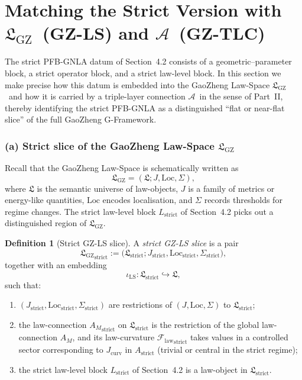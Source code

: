 \documentclass[11pt]{book}
\theoremstyle{plain}
\theoremstyle{definition}
\newtheorem{definition}[theorem]{Definition} \theoremstyle{remark}
\newcommand{\GZLStxt}{\textsf{GZ-LS}}   \newcommand{\GZLTtxt}{\textsf{GZ-LT}}   \newcommand{\GZLOCtxt}{\textsf{GZ-LOC}} \newcommand{\GZLCurvtxt}{\textsf{GZ-LCurv}}
\newcommand{\GZLS}{\ensuremath{\mathfrak{L}_{\mathrm{GZ}}}}       \newcommand{\GZLT}{\ensuremath{M_{!w}}}                           \newcommand{\GZLOC}{\ensuremath{A_M}}                             \newcommand{\GZLCurv}{\ensuremath{\mathcal{F}_{\mathrm{law}}}}
\newcommand{\GZTLCtxt}{\textsf{GZ-TLC}}                           \newcommand{\GZTLC}{\ensuremath{\mathcal{A}}}                     \newcommand{\GZGMS}{\textsf{GZ-GMS}}
\begin{document}
\section[Matching the Strict Version with \GZLStxt\ and \GZTLCtxt]{Matching the Strict Version with \GZLS\ (\GZLStxt) and \GZTLC\ (\GZTLCtxt)}


The strict PFB-GNLA datum of Section~4.2 consists of a geometric–parameter
block, a strict operator block, and a strict law-level block. In this
section we make precise how this datum is embedded into the GaoZheng
Law-Space \GZLS\ and how it is carried by a triple-layer connection
\GZTLC\ in the sense of Part~II, thereby identifying the strict PFB-GNLA
as a distinguished “flat or near-flat slice” of the full
GaoZheng G-Framework.



\subsubsection*{(a) Strict slice of the GaoZheng Law-Space \texorpdfstring{\GZLS}{GZ-LS}}

Recall that the GaoZheng Law-Space is schematically written as
\[
   \GZLS
   =
   (\mathfrak{L};J,\mathrm{Loc},\Sigma),
\]
where $\mathfrak{L}$ is the semantic universe of law-objects, $J$ is a
family of metrics or energy-like quantities, $\mathrm{Loc}$ encodes
localisation, and $\Sigma$ records thresholds for regime changes. The
strict law-level block $L_{\mathrm{strict}}$ of Section~4.2 picks out a
distinguished region of \GZLS.

\begin{definition}[Strict GZ-LS slice]
A \emph{strict GZ-LS slice} is a pair
  \[
     {\GZLS}_{\mathrm{strict}}
     :=
     \bigl(
       \mathfrak{L}_{\mathrm{strict}};
       J_{\mathrm{strict}},
       \mathrm{Loc}_{\mathrm{strict}},
       \Sigma_{\mathrm{strict}}
     \bigr),
  \]
  together with an embedding
  \[
     \iota_{\mathrm{LS}}:
        \mathfrak{L}_{\mathrm{strict}}\hookrightarrow\mathfrak{L},
  \]
  such that:
  \begin{enumerate}[label=\roman*)]
    \item $(J_{\mathrm{strict}},\mathrm{Loc}_{\mathrm{strict}},
           \Sigma_{\mathrm{strict}})$ are restrictions of
          $(J,\mathrm{Loc},\Sigma)$ to $\mathfrak{L}_{\mathrm{strict}}$;
    \item the law-connection ${\GZLOC}_{\mathrm{strict}}$ on
          $\mathfrak{L}_{\mathrm{strict}}$ is the restriction of the
          global law-connection \GZLOC, and its law-curvature
          ${\GZLCurv}_{\mathrm{strict}}$ takes values in a controlled
          sector corresponding to $J_{\mathrm{curv}}$ in
          $A_{\mathrm{strict}}$ (trivial or central in the strict regime);
    \item the strict law-level block $L_{\mathrm{strict}}$ of
          Section~4.2 is a law-object in $\mathfrak{L}_{\mathrm{strict}}$.
  \end{enumerate}
\end{definition}
\end{document}
